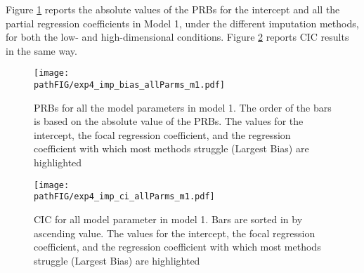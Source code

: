 \documentclass[]{./cls/interact}
\theoremstyle{plain}
\theoremstyle{definition}
\theoremstyle{remark}
\newcommand{\pathBIB}{./bib}
\newcommand{\pathFIG}{./figures}
\begin{document}
	Figure \ref{fig:exp4bias_m1} reports the absolute values of the PRBs for the intercept and all the partial 
	regression coefficients in Model 1, under the different imputation methods, for both the low- and high-dimensional
	conditions.
	Figure \ref{fig:exp4cir_m1} reports CIC results in the same way.

\begin{figure}
	\centering
	\texttt{[image: \\pathFIG/exp4\_imp\_bias\_allParms\_m1.pdf]}
	\caption{PRBs for all the model parameters in model 1. 
		The order of the bars is based on the absolute value of the PRBs.
		The values for the intercept, the focal regression coefficient, and the regression coefficient with which most 
		methods struggle (Largest Bias) are highlighted}
	\label{fig:exp4bias_m1}
\end{figure}

\begin{figure}
	\centering
	\texttt{[image: \\pathFIG/exp4\_imp\_ci\_allParms\_m1.pdf]}
	\caption{CIC for all model parameter in model 1.
		Bars are sorted in by ascending value.
		The values for the intercept, the focal regression coefficient, and the regression coefficient with which most 
		methods struggle (Largest Bias) are highlighted}
	\label{fig:exp4cir_m1}
\end{figure}

\FloatBarrier

 


\end{document}
